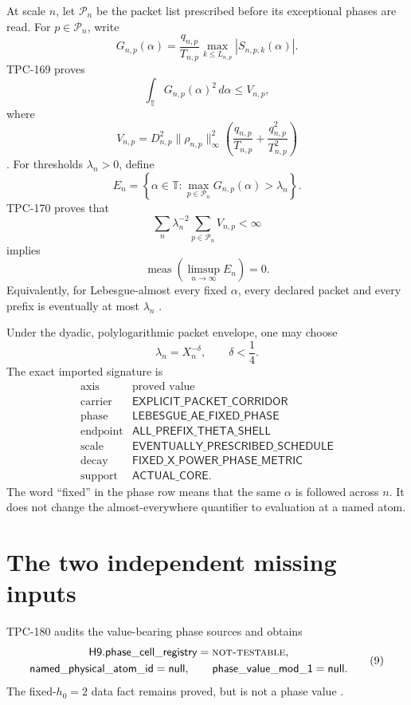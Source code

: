 \documentclass[11pt]{article}
\theoremstyle{definition}
\theoremstyle{remark}
\newcommand{\T}{\mathbb T}
\newcommand{\NT}{\textnormal{\textsc{not-testable}}}
\begin{document}
At scale \(n\), let \(\mathcal P_n\) be the packet list prescribed
before its exceptional phases are read.  For \(p\in\mathcal P_n\),
write
\[
 G_{n,p}(\alpha)
 =
 \frac{q_{n,p}}{T_{n,p}}
 \max_{k\le L_{n,p}}|S_{n,p,k}(\alpha)|.
\tag{1}\label{eq:G}
\]
TPC-169 proves
\[
 \int_{\T}G_{n,p}(\alpha)^2\,d\alpha\le V_{n,p},
\tag{2}\label{eq:energy}
\]
where
\[
 V_{n,p}
 =
 D_{n,p}^2\|\rho_{n,p}\|_\infty^2
 \left(\frac{q_{n,p}}{T_{n,p}}
       +\frac{q_{n,p}^2}{T_{n,p}^2}\right)
\tag{3}\label{eq:V}
\]
\citep{WangTPC169}.  For thresholds \(\lambda_n>0\), define
\[
 E_n
 =
 \left\{\alpha\in\T:
 \max_{p\in\mathcal P_n}G_{n,p}(\alpha)>\lambda_n
 \right\}.
\tag{4}\label{eq:En}
\]
TPC-170 proves that
\[
 \sum_n\lambda_n^{-2}
 \sum_{p\in\mathcal P_n}V_{n,p}<\infty
\tag{5}\label{eq:summability}
\]
implies
\[
 \operatorname{meas}\!\left(\limsup_{n\to\infty}E_n\right)=0.
\tag{6}\label{eq:limsup}
\]
Equivalently, for Lebesgue-almost every fixed \(\alpha\), every
declared packet and every prefix is eventually at most
\(\lambda_n\) \citep{WangTPC170}.

Under the dyadic, polylogarithmic packet envelope, one may choose
\[
 \lambda_n=X_n^{-\delta},\qquad \delta<\frac14.
\tag{7}\label{eq:power}
\]
The exact imported signature is
\[
\begin{array}{c|c}
\text{axis}&\text{proved value}\\
\hline
\text{carrier}&\mathsf{EXPLICIT\_PACKET\_CORRIDOR}\\
\text{phase}&\mathsf{LEBESGUE\_AE\_FIXED\_PHASE}\\
\text{endpoint}&\mathsf{ALL\_PREFIX\_THETA\_SHELL}\\
\text{scale}&\mathsf{EVENTUALLY\_PRESCRIBED\_SCHEDULE}\\
\text{decay}&\mathsf{FIXED\_X\_POWER\_PHASE\_METRIC}\\
\text{support}&\mathsf{ACTUAL\_CORE}.
\end{array}
\tag{8}\label{eq:metric-signature}
\]
The word ``fixed'' in the phase row means that the same \(\alpha\) is
followed across \(n\).  It does not change the almost-everywhere
quantifier to evaluation at a named atom.

\section{The two independent missing inputs}

TPC-180 audits the value-bearing phase sources and obtains
\[
\begin{gathered}
\mathsf{H9.phase\_cell\_registry}=\NT,\\
\mathsf{named\_physical\_atom\_id}=\mathsf{null},\qquad
\mathsf{phase\_value\_mod\_1}=\mathsf{null}.
\end{gathered}
\tag{9}\label{eq:registry}
\]
The fixed-\(h_0=2\) data fact remains proved, but is not a phase value
\citep{WangTPC180}.
\end{document}
